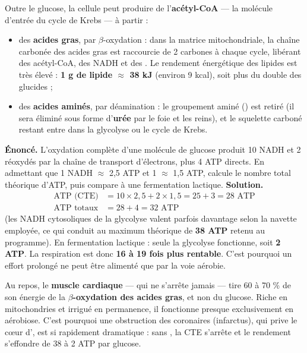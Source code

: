 \documentclass[11pt]{article}
\newcommand{\cle}[1]{{\popxbold\color{popdark}#1}}
\begin{document}
\begin{definition}
Outre le glucose, la cellule peut produire de l'\textbf{acétyl-CoA} — la molécule d'entrée du cycle de Krebs — à partir :
\begin{itemize}
\item des \textbf{acides gras}, par \cle{$\beta$-oxydation} : dans la matrice mitochondriale, la chaîne carbonée des acides gras est raccourcie de 2 carbones à chaque cycle, libérant des acétyl-CoA, des NADH et des . Le rendement énergétique des lipides est très élevé : \textbf{1 g de lipide $\approx$ 38 kJ} (environ 9 kcal), soit plus du double des glucides ;
\item des \textbf{acides aminés}, par \cle{déamination} : le groupement aminé () est retiré (il sera éliminé sous forme d'\textbf{urée} par le foie et les reins), et le squelette carboné restant entre dans la glycolyse ou le cycle de Krebs.
\end{itemize}
\end{definition}

\begin{exoresolu}
\textbf{Énoncé.} L'oxydation complète d'une molécule de glucose produit 10 NADH et 2  réoxydés par la chaîne de transport d'électrons, plus 4 ATP directs. En admettant que 1 NADH $\approx$ 2,5 ATP et 1  $\approx$ 1,5 ATP, calcule le nombre total théorique d'ATP, puis compare à une fermentation lactique.
\tcblower
\textbf{Solution.}
\begin{align*}
\text{ATP (CTE)} &= 10 \times 2{,}5 + 2 \times 1{,}5 = 25 + 3 = 28 \text{ ATP}\\
\text{ATP totaux} &= 28 + 4 = 32 \text{ ATP}
\end{align*}
(les NADH cytosoliques de la glycolyse valent parfois davantage selon la navette employée, ce qui conduit au maximum théorique de \textbf{38 ATP} retenu au programme). En fermentation lactique : seule la glycolyse fonctionne, soit \textbf{2 ATP}. La respiration est donc \textbf{16 à 19 fois plus rentable}. C'est pourquoi un effort prolongé ne peut être alimenté que par la voie aérobie.
\end{exoresolu}

\begin{savaistu}
Au repos, le \textbf{muscle cardiaque} — qui ne s'arrête jamais — tire 60 à 70 \% de son énergie de la \textbf{$\beta$-oxydation des acides gras}, et non du glucose. Riche en mitochondries et irrigué en permanence, il fonctionne presque exclusivement en aérobiose. C'est pourquoi une obstruction des coronaires (infarctus), qui prive le cœur d', est si rapidement dramatique : sans , la CTE s'arrête et le rendement s'effondre de 38 à 2 ATP par glucose.
\end{savaistu}
\end{document}
